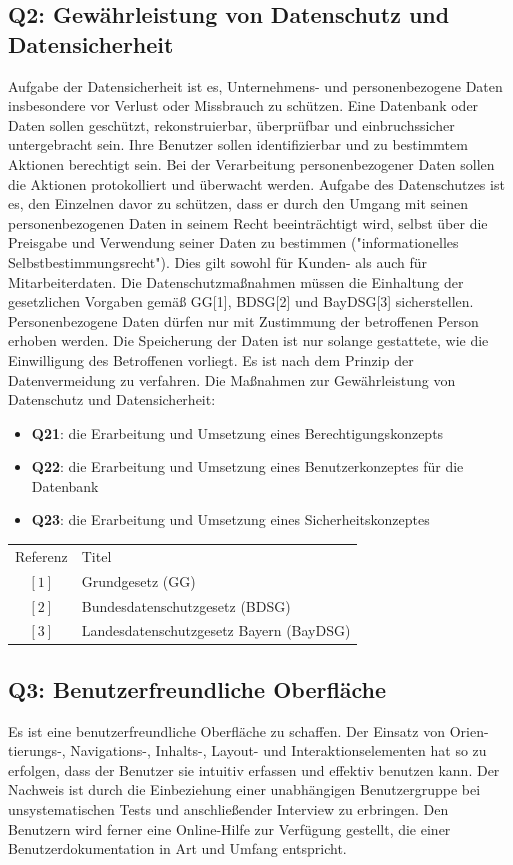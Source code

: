 \documentclass[10pt,a4paper]{scrartcl}
\begin{document}
\subsection{Q2: Gewährleistung von Datenschutz und Datensicherheit}
Aufgabe der Datensicherheit ist es, Unternehmens- und personenbezogene Daten insbesondere vor Verlust oder Missbrauch zu schützen. Eine Datenbank oder Daten sollen geschützt, rekonstruierbar, überprüfbar und einbruchssicher untergebracht sein. Ihre Benutzer sollen identifizierbar und zu bestimmtem Aktionen berechtigt sein. Bei der Verarbeitung personenbezogener Daten sollen die Aktionen protokolliert und überwacht werden. Aufgabe des Datenschutzes ist es, den Einzelnen davor zu schützen, dass er durch den Umgang mit seinen personenbezogenen Daten in seinem Recht beeinträchtigt wird, selbst über die Preisgabe und Verwendung seiner Daten zu bestimmen ("informationelles Selbstbestimmungsrecht"). Dies gilt sowohl für Kunden- als auch für Mitarbeiterdaten. Die Datenschutzmaßnahmen müssen die Einhaltung der gesetzlichen Vorgaben gemäß GG[1], BDSG[2] und BayDSG[3] sicherstellen. Personenbezogene Daten dürfen nur mit Zustimmung der betroffenen Person erhoben werden. Die Speicherung der Daten ist nur solange gestattete, wie die Einwilligung des Betroffenen vorliegt. Es ist nach dem Prinzip der Datenvermeidung zu verfahren. Die Maßnahmen zur Gewährleistung von Datenschutz und Datensicherheit:
\begin{itemize}
	\item[] \textbf{Q21}: die Erarbeitung und Umsetzung eines Berechtigungskonzepts
	\item[] \textbf{Q22}: die Erarbeitung und Umsetzung eines Benutzerkonzeptes für die Datenbank
	\item[] \textbf{Q23}: die Erarbeitung und Umsetzung eines Sicherheitskonzeptes
\end{itemize}
\bigskip
\begin{tabular}{cl}
Referenz & Titel\\
$[1]$ & Grundgesetz (GG)\\
$[2]$ & Bundesdatenschutzgesetz (BDSG)\\
$[3]$ & Landesdatenschutzgesetz Bayern (BayDSG)
\end{tabular}


\subsection{Q3: Benutzerfreundliche Oberfläche}
Es ist eine benutzerfreundliche Oberfläche zu schaffen. Der Einsatz von Orien-tierungs-, Navigations-, Inhalts-, Layout- und Interaktionselementen hat so zu erfolgen, dass der Benutzer sie intuitiv erfassen und effektiv benutzen kann. Der Nachweis ist durch die Einbeziehung einer unabhängigen Benutzergruppe bei unsystematischen Tests und anschließender Interview zu erbringen. Den Benutzern wird ferner eine Online-Hilfe zur Verfügung gestellt, die einer Benutzerdokumentation in Art und Umfang entspricht.
\end{document}
